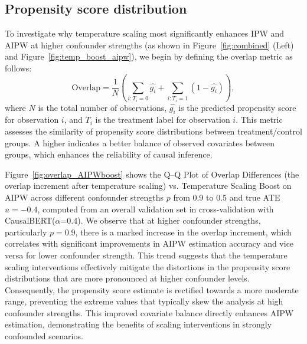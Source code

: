 \documentclass[11pt]{article}
\begin{document}
\subsection{Propensity score distribution}
\label{sec:propensity_score_balance}
To investigate why temperature scaling most significantly enhances IPW and AIPW at higher confounder strengths (as shown in Figure~\ref{fig:combined} (Left) and Figure~\ref{fig:temp_boost_aipw}), we begin by defining the overlap metric as follows:
\[
\text{Overlap} = \frac{1}{N} \left( \sum_{i: T_i = 0} \hat{g_i} + \sum_{i: T_i = 1} (1 - \hat{g_i}) \right),
\]
where $N$ is the total number of observations, $\hat{g_i}$ is the predicted propensity score for observation $i$, and $T_i$ is the treatment label for observation $i$. This  metric assesses the similarity of propensity score distributions between treatment/control groups. A higher  indicates a better balance of observed covariates between groups, which enhances the reliability of causal inference. 

Figure~\ref{fig:overlap_AIPWboost} shows the Q–Q Plot of Overlap Differences (the overlap 
increment after temperature scaling) vs. Temperature Scaling Boost on AIPW across different confounder strengths $p$ from 0.9 to 0.5 and true ATE $u=-0.4$, computed from an overall validation set in cross-validation with CausalBERT(\(\alpha\)=0.4). We observe that at higher confounder strengths, particularly \( p = 0.9 \), there is a marked increase in the overlap increment, which correlates with significant improvements in AIPW estimation accuracy and vice versa for lower confounder strength. This trend suggests that the temperature scaling interventions effectively mitigate the distortions in the propensity score distributions that are more pronounced at higher confounder levels. Consequently, the propensity score estimate is rectified towards a more moderate range, preventing the extreme values that typically skew the analysis at high confounder strengths. This improved covariate balance directly enhances AIPW estimation, demonstrating the benefits of scaling interventions in strongly confounded scenarios.
\end{document}
